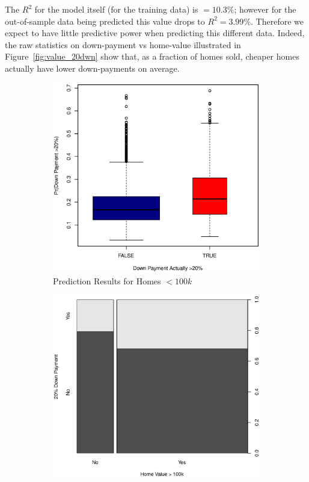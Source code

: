 \documentclass[11pt, fleqn]{article}
\begin{document}
The $R^2$ for the model itself (for the training data) is $=10.3\%$; however for the out-of-sample data being predicted this value drops to $R^2=3.99\%$.  Therefore we expect to have little predictive power when predicting this different data.  Indeed, the raw statistics on down-payment vs home-value illustrated in Figure~\vref{fig:value_20dwn} show that, as a fraction of homes sold, cheaper homes actually have lower down-payments on average.  

\begin{figure}
  \centering
  \begin{subfigure}[b]{0.49\textwidth}
    \includegraphics[scale=.5]{oos_lt100k.eps}
    \caption{Prediction Results for Homes $<100k$}
    \label{fig:oos_lt100k}
  \end{subfigure}
  \hfill
  \begin{subfigure}[b]{0.49\textwidth}
    \includegraphics[scale=.5]{home_value_vs_20_down.eps}

\end{subfigure}
\end{figure}
\end{document}
